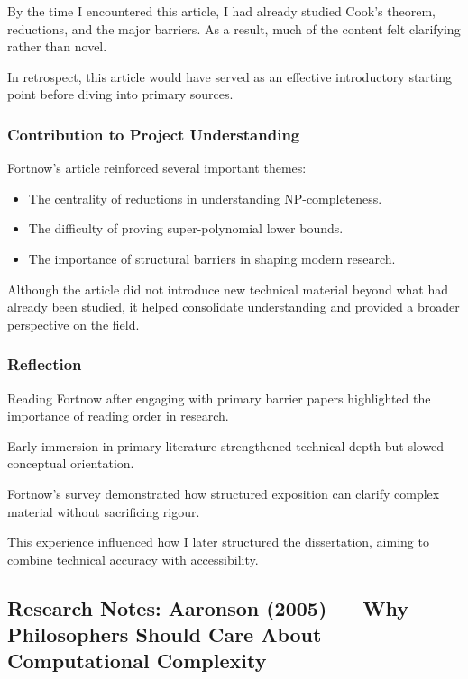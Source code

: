 \documentclass[12pt]{article}
\begin{document}
By the time I encountered this article, I had already studied Cook's theorem, reductions, and the major barriers. As a result, much of the content felt clarifying rather than novel.

In retrospect, this article would have served as an effective introductory starting point before diving into primary sources.

\subsubsection*{Contribution to Project Understanding}

Fortnow's article reinforced several important themes:

\begin{itemize}
\item The centrality of reductions in understanding NP-completeness.
\item The difficulty of proving super-polynomial lower bounds.
\item The importance of structural barriers in shaping modern research.
\end{itemize}

Although the article did not introduce new technical material beyond what had already been studied, it helped consolidate understanding and provided a broader perspective on the field.

\subsubsection*{Reflection}

Reading Fortnow after engaging with primary barrier papers highlighted the importance of reading order in research.

Early immersion in primary literature strengthened technical depth but slowed conceptual orientation.

Fortnow's survey demonstrated how structured exposition can clarify complex material without sacrificing rigour.

This experience influenced how I later structured the dissertation, aiming to combine technical accuracy with accessibility.

\subsection{Research Notes: Aaronson (2005) --- Why Philosophers Should Care About Computational Complexity}
\end{document}

